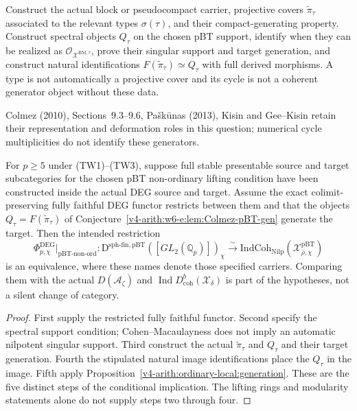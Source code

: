 \begin{conjecture}
\label{v4-arith:w6-e:lem:Colmez-pBT-gen}
Construct the actual block or pseudocompact carrier, projective covers
$\widetilde\pi_\tau$ associated to the relevant types $\sigma(\tau)$,
and their compact-generating property. Construct spectral objects
$Q_\tau$ on the chosen pBT support, identify when they can be realized
as $\mathcal O_{\mathcal X^{\mathrm{BM},\tau}}$, prove their singular
support and target generation, and construct natural identifications
$F(\widetilde\pi_\tau)\simeq Q_\tau$ with full derived morphisms.
A type is not automatically a projective cover and its cycle is not
a coherent generator object without these data.
\end{conjecture}
Colmez (2010), Sections~9.3--9.6, Pa\v{s}k\=unas (2013), Kisin and
Gee--Kisin retain their representation and deformation roles in this
question; numerical cycle multiplicities do not identify these generators.

\begin{theorem}
\label{v4-arith:w6-e:thm:f1a1-pBT-nonord}
For $p\ge5$ under (TW1)--(TW3), suppose full stable presentable
source and target subcategories for the chosen pBT non-ordinary lifting
condition have been constructed inside the actual DEG source and target.
Assume the exact colimit-preserving fully faithful DEG functor restricts
between them and that the objects $Q_\tau=F(\widetilde\pi_\tau)$ of
Conjecture~\ref{v4-arith:w6-e:lem:Colmez-pBT-gen} generate the target.
Then the intended restriction
\[
 \Phi^{\mathrm{DEG}}_{p,\chi}|_{\mathrm{pBT\text{-}non\text{-}ord}}:
 \mathrm D^{\mathrm{sph\text{-}fin,pBT}}([GL_2(\mathbb Q_p)])_\chi
 \xrightarrow{\sim}
 \mathrm{IndCoh}_{\mathrm{Nilp}}(\mathcal X^{\mathrm{pBT}}_{\bar\rho,\chi})
\]
is an equivalence, where these names denote those specified carriers.
Comparing them with the actual $D(\mathcal A_\zeta)$ and
$\operatorname{Ind}D^b_{\mathrm{coh}}(\mathcal X_\delta)$ is part of
the hypotheses, not a silent change of category.
\end{theorem}
\begin{proof}
First supply the restricted fully faithful functor. Second specify the
spectral support condition; Cohen--Macaulayness does not imply an
automatic nilpotent singular support. Third construct the actual
$\widetilde\pi_\tau$ and $Q_\tau$ and their target generation.
Fourth the stipulated natural image identifications place the
$Q_\tau$ in the image. Fifth apply
Proposition~\ref{v4-arith:ordinary-local:generation}. These are the
five distinct steps of the conditional implication. The lifting rings
and modularity statements alone do not supply steps two through four.
\end{proof}

